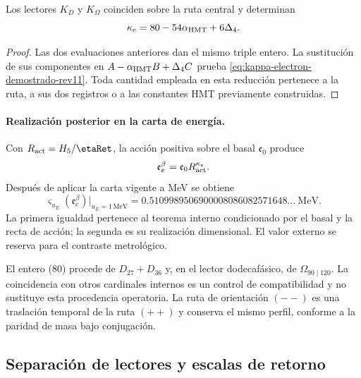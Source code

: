 \begin{theorem}
\label{thm:reduccion-electron-two-way-rev11}
Los lectores \(K_D\) y \(K_\Omega\) coinciden sobre la ruta central y
determinan
\begin{equation}
 \kappa_e=80-54\alpha_{\rm HMT}+6\Delta_4.
 \label{eq:kappa-electron-demostrado-rev11}
\end{equation}
\end{theorem}

\begin{proof}
Las dos evaluaciones anteriores dan el mismo triple entero. La sustitución
de sus componentes en
\(A-\alpha_{\rm HMT}B+\Delta_4C\) prueba
\eqref{eq:kappa-electron-demostrado-rev11}. Toda cantidad empleada en esta
reducción pertenece a la ruta, a sus dos registros o a las constantes HMT
previamente construidas.
\end{proof}

\paragraph{Realización posterior en la carta de energía.}
Con \(R_{\rm act}=H_5/\etaRet\), la acción positiva sobre el basal
\(\mathfrak e_0\) produce
\begin{equation}
 \mathfrak e_e^\beta
 =\mathfrak e_0R_{\rm act}^{\kappa_e}.
 \label{eq:masa-electron-adimensional-two-way-rev11}
\end{equation}
Después de aplicar la carta vigente a MeV se obtiene
\begin{equation}
 \varsigma_{u_E}(\mathfrak e_e^\beta)\big|_{u_E=1\,\mathrm{MeV}}
 =0.5109989506900008086082571648\ldots\ \mathrm{MeV}.
 \label{eq:masa-electron-two-way-rev11}
\end{equation}
La primera igualdad pertenece al teorema interno condicionado por el basal y
la recta de acción; la segunda es su realización dimensional. El valor
externo se reserva para el contraste metrológico.

El entero (80) procede de \(D_{27}+D_{36}\) y, en el lector dodecafásico,
de \(\Omega_{90\mid120}\). La coincidencia con otros cardinales internos es
un control de compatibilidad y no sustituye esta procedencia operatoria. La
ruta de orientación \((--)\) es una traslación temporal de la ruta \((++)\)
y conserva el mismo perfil, conforme a la paridad de masa bajo conjugación.

\subsection{Separación de lectores y escalas de retorno}

